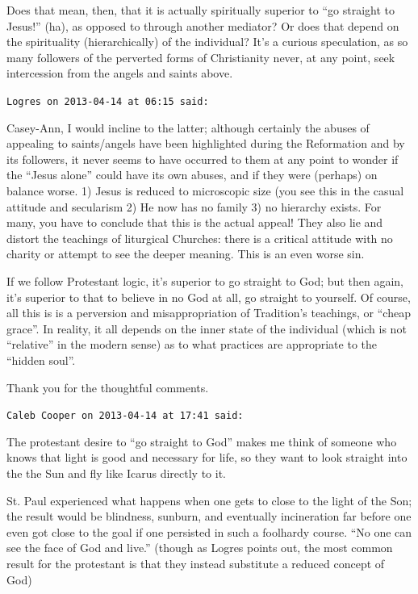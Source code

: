 \begin{footnotesize}
\begin{sffamily}
Does that mean, then, that it is actually spiritually superior to “go straight to Jesus!” (ha), as opposed to through another mediator? Or does that depend on the spirituality (hierarchically) of the individual? It's a curious speculation, as so many followers of the perverted forms of Christianity never, at any point, seek intercession from the angels and saints above.


\hfill

\texttt{Logres on 2013-04-14 at 06:15 said: }

Casey-Ann, I would incline to the latter; although certainly the abuses of appealing to saints/angels have been highlighted during the Reformation and by its followers, it never seems to have occurred to them at any point to wonder if the “Jesus alone” could have its own abuses, and if they were (perhaps) on balance worse. 1) Jesus is reduced to microscopic size (you see this in the casual attitude and secularism 2) He now has no family 3) no hierarchy exists. For many, you have to conclude that this is the actual appeal! They also lie and distort the teachings of liturgical Churches: there is a critical attitude with no charity or attempt to see the deeper meaning. This is an even worse sin. 

If we follow Protestant logic, it's superior to go straight to God; but then again, it's superior to that to believe in no God at all, go straight to yourself. Of course, all this is is a perversion and misappropriation of Tradition's teachings, or “cheap grace”. In reality, it all depends on the inner state of the individual (which is not “relative” in the modern sense) as to what practices are appropriate to the “hidden soul”. 

Thank you for the thoughtful comments.


\hfill

\texttt{Caleb Cooper on 2013-04-14 at 17:41 said: }

The protestant desire to “go straight to God” makes me think of someone who knows that light is good and necessary for life, so they want to look straight into the the Sun and fly like Icarus directly to it. 

St. Paul experienced what happens when one gets to close to the light of the Son; the result would be blindness, sunburn, and eventually incineration far before one even got close to the goal if one persisted in such a foolhardy course. “No one can see the face of God and live.” (though as Logres points out, the most common result for the protestant is that they instead substitute a reduced concept of God) 


\end{sffamily}
\end{footnotesize}
